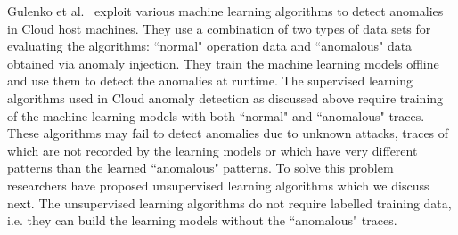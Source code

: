 Gulenko et al.~\cite{ML_based_ids:2016} exploit various machine learning algorithms to detect anomalies in Cloud host machines. They use a combination of two types of data sets for evaluating the algorithms: ``normal" operation data and ``anomalous" data obtained via anomaly injection. They train the machine learning models offline and use them to detect the anomalies at runtime. 
The supervised learning algorithms used in Cloud anomaly detection as discussed above require training of the machine learning models with both ``normal" and ``anomalous" traces. 
These algorithms may fail to detect anomalies due to unknown attacks, traces of which are not recorded by the learning models or which have very different patterns than the learned ``anomalous" patterns.
To solve this problem researchers have proposed unsupervised learning algorithms which we discuss next. The unsupervised learning algorithms do not require labelled training data, i.e. they can build the learning models without the ``anomalous" traces.  

